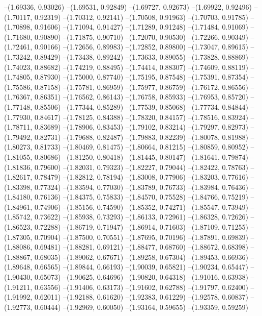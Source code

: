 --(1.69336, 0.93026)
--(1.69531, 0.92849)
--(1.69727, 0.92673)
--(1.69922, 0.92496)
--(1.70117, 0.92319)
--(1.70312, 0.92141)
--(1.70508, 0.91963)
--(1.70703, 0.91785)
--(1.70898, 0.91606)
--(1.71094, 0.91427)
--(1.71289, 0.91248)
--(1.71484, 0.91069)
--(1.71680, 0.90890)
--(1.71875, 0.90710)
--(1.72070, 0.90530)
--(1.72266, 0.90349)
--(1.72461, 0.90166)
--(1.72656, 0.89983)
--(1.72852, 0.89800)
--(1.73047, 0.89615)
--(1.73242, 0.89429)
--(1.73438, 0.89242)
--(1.73633, 0.89055)
--(1.73828, 0.88869)
--(1.74023, 0.88682)
--(1.74219, 0.88495)
--(1.74414, 0.88307)
--(1.74609, 0.88119)
--(1.74805, 0.87930)
--(1.75000, 0.87740)
--(1.75195, 0.87548)
--(1.75391, 0.87354)
--(1.75586, 0.87158)
--(1.75781, 0.86959)
--(1.75977, 0.86759)
--(1.76172, 0.86556)
--(1.76367, 0.86351)
--(1.76562, 0.86143)
--(1.76758, 0.85933)
--(1.76953, 0.85720)
--(1.77148, 0.85506)
--(1.77344, 0.85289)
--(1.77539, 0.85068)
--(1.77734, 0.84844)
--(1.77930, 0.84617)
--(1.78125, 0.84388)
--(1.78320, 0.84157)
--(1.78516, 0.83924)
--(1.78711, 0.83689)
--(1.78906, 0.83453)
--(1.79102, 0.83214)
--(1.79297, 0.82973)
--(1.79492, 0.82731)
--(1.79688, 0.82487)
--(1.79883, 0.82239)
--(1.80078, 0.81988)
--(1.80273, 0.81733)
--(1.80469, 0.81475)
--(1.80664, 0.81215)
--(1.80859, 0.80952)
--(1.81055, 0.80686)
--(1.81250, 0.80418)
--(1.81445, 0.80147)
--(1.81641, 0.79874)
--(1.81836, 0.79600)
--(1.82031, 0.79323)
--(1.82227, 0.79044)
--(1.82422, 0.78763)
--(1.82617, 0.78479)
--(1.82812, 0.78194)
--(1.83008, 0.77906)
--(1.83203, 0.77616)
--(1.83398, 0.77324)
--(1.83594, 0.77030)
--(1.83789, 0.76733)
--(1.83984, 0.76436)
--(1.84180, 0.76136)
--(1.84375, 0.75833)
--(1.84570, 0.75528)
--(1.84766, 0.75219)
--(1.84961, 0.74906)
--(1.85156, 0.74590)
--(1.85352, 0.74271)
--(1.85547, 0.73949)
--(1.85742, 0.73622)
--(1.85938, 0.73293)
--(1.86133, 0.72961)
--(1.86328, 0.72626)
--(1.86523, 0.72288)
--(1.86719, 0.71947)
--(1.86914, 0.71603)
--(1.87109, 0.71255)
--(1.87305, 0.70904)
--(1.87500, 0.70551)
--(1.87695, 0.70196)
--(1.87891, 0.69839)
--(1.88086, 0.69481)
--(1.88281, 0.69121)
--(1.88477, 0.68760)
--(1.88672, 0.68398)
--(1.88867, 0.68035)
--(1.89062, 0.67671)
--(1.89258, 0.67304)
--(1.89453, 0.66936)
--(1.89648, 0.66565)
--(1.89844, 0.66193)
--(1.90039, 0.65821)
--(1.90234, 0.65447)
--(1.90430, 0.65073)
--(1.90625, 0.64696)
--(1.90820, 0.64318)
--(1.91016, 0.63938)
--(1.91211, 0.63556)
--(1.91406, 0.63173)
--(1.91602, 0.62788)
--(1.91797, 0.62400)
--(1.91992, 0.62011)
--(1.92188, 0.61620)
--(1.92383, 0.61229)
--(1.92578, 0.60837)
--(1.92773, 0.60444)
--(1.92969, 0.60050)
--(1.93164, 0.59655)
--(1.93359, 0.59259)
